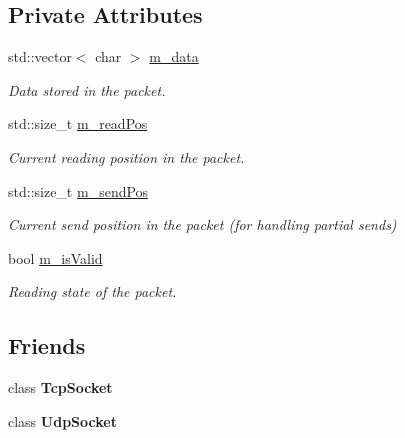 \subsection*{Private Attributes}
\begin{DoxyCompactItemize}
\item 
\mbox{\label{classsf_1_1_packet_a185e3d4b4c2b31560ea7723d6f2b22dd}} 
std\+::vector$<$ char $>$ \mbox{\hyperlink{classsf_1_1_packet_a185e3d4b4c2b31560ea7723d6f2b22dd}{m\+\_\+data}}
\begin{DoxyCompactList}\small\item\em Data stored in the packet. \end{DoxyCompactList}\item 
\mbox{\label{classsf_1_1_packet_a874eea8a5654957a404c3b40b7ef9284}} 
std\+::size\+\_\+t \mbox{\hyperlink{classsf_1_1_packet_a874eea8a5654957a404c3b40b7ef9284}{m\+\_\+read\+Pos}}
\begin{DoxyCompactList}\small\item\em Current reading position in the packet. \end{DoxyCompactList}\item 
\mbox{\label{classsf_1_1_packet_a321ac7748c681850fad1c52fa265434d}} 
std\+::size\+\_\+t \mbox{\hyperlink{classsf_1_1_packet_a321ac7748c681850fad1c52fa265434d}{m\+\_\+send\+Pos}}
\begin{DoxyCompactList}\small\item\em Current send position in the packet (for handling partial sends) \end{DoxyCompactList}\item 
\mbox{\label{classsf_1_1_packet_a7119dcd69dbd57041e60a3062ced96e6}} 
bool \mbox{\hyperlink{classsf_1_1_packet_a7119dcd69dbd57041e60a3062ced96e6}{m\+\_\+is\+Valid}}
\begin{DoxyCompactList}\small\item\em Reading state of the packet. \end{DoxyCompactList}\end{DoxyCompactItemize}
\subsection*{Friends}
\begin{DoxyCompactItemize}
\item 
\mbox{\label{classsf_1_1_packet_aa8b32310b01d4bb702d6bcb969d5f130}} 
class {\bfseries Tcp\+Socket}
\item 
\mbox{\label{classsf_1_1_packet_ae128c6687ced82c6157c5f865f8dec5c}} 
class {\bfseries Udp\+Socket}
\end{DoxyCompactItemize}


